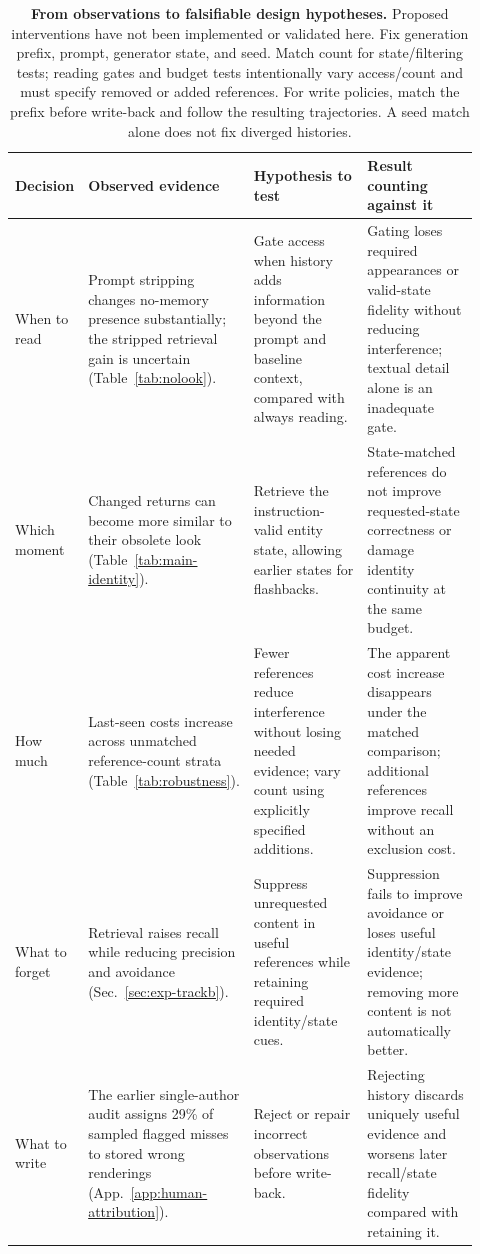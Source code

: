 \begin{table}[t]
\centering
\caption{\textbf{From observations to falsifiable design hypotheses.} Proposed interventions have not been implemented or validated here. Fix generation prefix, prompt, generator state, and seed. Match count for state/filtering tests; reading gates and budget tests intentionally vary access/count and must specify removed or added references. For write policies, match the prefix before write-back and follow the resulting trajectories. A seed match alone does not fix diverged histories.}
\label{tab:directions}
\footnotesize
\setlength{\tabcolsep}{3pt}
\begin{tabular}{@{}>{\raggedright\arraybackslash}p{0.10\linewidth}
                >{\raggedright\arraybackslash}p{0.27\linewidth}
                >{\raggedright\arraybackslash}p{0.28\linewidth}
                >{\raggedright\arraybackslash}p{0.27\linewidth}@{}}
\toprule
Decision & Observed evidence & Hypothesis to test & Result counting against it \\
\midrule
When to read & Prompt stripping changes no-memory presence substantially; the stripped retrieval gain is uncertain (Table~\ref{tab:nolook}). & Gate access when history adds information beyond the prompt and baseline context, compared with always reading. & Gating loses required appearances or valid-state fidelity without reducing interference; textual detail alone is an inadequate gate. \\
Which moment & Changed returns can become more similar to their obsolete look (Table~\ref{tab:main-identity}). & Retrieve the instruction-valid entity state, allowing earlier states for flashbacks. & State-matched references do not improve requested-state correctness or damage identity continuity at the same budget. \\
How much & Last-seen costs increase across unmatched reference-count strata (Table~\ref{tab:robustness}). & Fewer references reduce interference without losing needed evidence; vary count using explicitly specified additions. & The apparent cost increase disappears under the matched comparison; additional references improve recall without an exclusion cost. \\
What to forget & Retrieval raises recall while reducing precision and avoidance (Sec.~\ref{sec:exp-trackb}). & Suppress unrequested content in useful references while retaining required identity/state cues. & Suppression fails to improve avoidance or loses useful identity/state evidence; removing more content is not automatically better. \\
What to write & The earlier single-author audit assigns 29\% of sampled flagged misses to stored wrong renderings (App.~\ref{app:human-attribution}). & Reject or repair incorrect observations before write-back. & Rejecting history discards uniquely useful evidence and worsens later recall/state fidelity compared with retaining it. \\
\bottomrule
\end{tabular}
\end{table}
